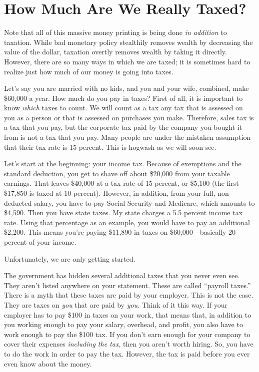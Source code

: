\section{How Much Are We Really Taxed?}

Note that all of this massive money printing is being done \textit{in
addition }to taxation. While bad monetary policy stealthily removes
wealth by decreasing the value of the dollar, taxation overtly removes
wealth by taking it directly. However, there are so many ways in which
we are taxed; it is sometimes hard to realize just how much of our
money is going into taxes.

Let’s say you are married with no kids, and you and your wife, combined,
make \$60,000 a year. How much do you pay in taxes?  First of all, it
is important to know \textit{which} taxes to count. We will count as a
tax any tax that is assessed on you as a person or that is assessed on
purchases you make. Therefore, sales tax is a tax that you pay, but the
corporate tax paid by the company you bought it from is not a tax that
you pay. Many people are under the mistaken assumption that their tax
rate is 15 percent. This is hogwash as we will soon see.

Let’s start at the beginning: your income tax. Because of exemptions and
the standard deduction, you get to shave off about \$20,000 from your
taxable earnings.
That leaves \$40,000 at a tax rate of 15 percent, or \$5,100 (the first
\$17,850 is taxed at 10 percent). However, in addition, from your full,
non-deducted salary, you have to pay Social Security and Medicare,
which amounts to \$4,590. Then you have state taxes. My state charges a
5.5 percent income tax
rate. Using that
percentage as an example, you would have to pay an additional \$2,200.
This means you’re
paying \$11,890 in taxes on \$60,000—basically 20 percent of
your income. 

Unfortunately, we are
only getting started.

The government has hidden several additional taxes that you never even
see. They aren’t listed anywhere on your statement. These are called
“payroll taxes.”  There is a myth that these taxes are paid by your
employer. This is not the case. They are taxes on \textit{you }that are
paid by\textit{ you}. Think of it this way. If your employer has to pay
\$100 in taxes on
your work, that means that, in addition to you working enough to pay
your salary, overhead, and profit, you also have to work enough to pay
the \$100 tax. If you don’t earn enough for your company to cover their
expenses \textit{including the tax}, then you aren’t worth hiring. So,
you have to do the work in order to pay the tax. However, the tax is
paid before you ever even know about the money.


